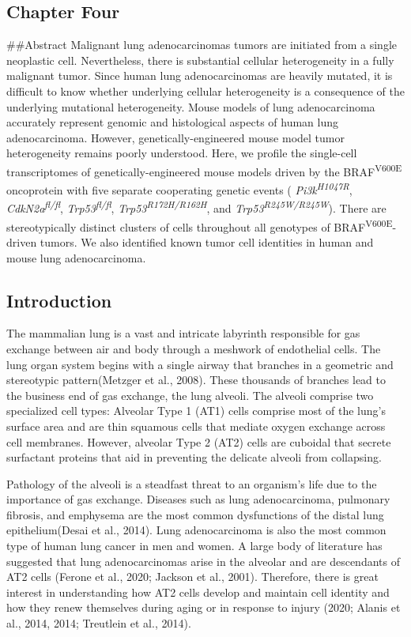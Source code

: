 \hypertarget{chapter-four}{%
\subsection{Chapter Four}\label{chapter-four}}

\#\#Abstract
Malignant lung adenocarcinomas tumors are initiated from a single neoplastic cell. Nevertheless, there is substantial cellular heterogeneity in a fully malignant tumor. Since human lung adenocarcinomas are heavily mutated, it is difficult to know whether underlying cellular heterogeneity is a consequence of the underlying mutational heterogeneity. Mouse models of lung adenocarcinoma accurately represent genomic and histological aspects of human lung adenocarcinoma. However, genetically-engineered mouse model tumor heterogeneity remains poorly understood. Here, we profile the single-cell transcriptomes of genetically-engineered mouse models driven by the BRAF\textsuperscript{V600E} oncoprotein with five separate cooperating genetic events ( \emph{Pi3k\textsuperscript{H1047R}}, \emph{CdkN2a\textsuperscript{fl/fl}}, \emph{Trp53\textsuperscript{fl/fl}}, \emph{Trp53\textsuperscript{R172H/R162H}}, and \emph{Trp53\textsuperscript{R245W/R245W}}). There are stereotypically distinct clusters of cells throughout all genotypes of BRAF\textsuperscript{V600E}-driven tumors. We also identified known tumor cell identities in human and mouse lung adenocarcinoma.

\hypertarget{introduction-2}{%
\subsection{Introduction}\label{introduction-2}}

The mammalian lung is a vast and intricate labyrinth responsible for gas exchange between air and body through a meshwork of endothelial cells. The lung organ system begins with a single airway that branches in a geometric and stereotypic pattern(Metzger et al., 2008). These thousands of branches lead to the business end of gas exchange, the lung alveoli. The alveoli comprise two specialized cell types: Alveolar Type 1 (AT1) cells comprise most of the lung's surface area and are thin squamous cells that mediate oxygen exchange across cell membranes. However, alveolar Type 2 (AT2) cells are cuboidal that secrete surfactant proteins that aid in preventing the delicate alveoli from collapsing.

Pathology of the alveoli is a steadfast threat to an organism's life due to the importance of gas exchange. Diseases such as lung adenocarcinoma, pulmonary fibrosis, and emphysema are the most common dysfunctions of the distal lung epithelium(Desai et al., 2014). Lung adenocarcinoma is also the most common type of human lung cancer in men and women. A large body of literature has suggested that lung adenocarcinomas arise in the alveolar and are descendants of AT2 cells (Ferone et al., 2020; Jackson et al., 2001). Therefore, there is great interest in understanding how AT2 cells develop and maintain cell identity and how they renew themselves during aging or in response to injury (2020; Alanis et al., 2014, 2014; Treutlein et al., 2014).

